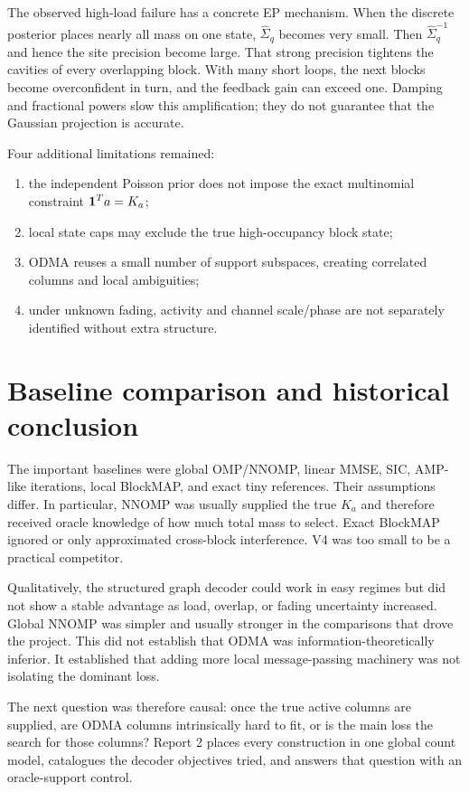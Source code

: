 \documentclass[11pt]{article}
\begin{document}
The observed high-load failure has a concrete EP mechanism. When the discrete posterior places nearly all mass on one
state, $\widehat\Sigma_q$ becomes very small. Then $\widehat\Sigma_q^{-1}$ and hence the site precision become large.
That strong precision tightens the cavities of every overlapping block. With many short loops, the next blocks become
overconfident in turn, and the feedback gain can exceed one. Damping and fractional powers slow this amplification;
they do not guarantee that the Gaussian projection is accurate.

Four additional limitations remained:
\begin{enumerate}
 \item the independent Poisson prior does not impose the exact multinomial constraint $\mathbf{1}^Ta=K_a$;
 \item local state caps may exclude the true high-occupancy block state;
 \item ODMA reuses a small number of support subspaces, creating correlated columns and local ambiguities;
 \item under unknown fading, activity and channel scale/phase are not separately identified without extra structure.
\end{enumerate}

\section{Baseline comparison and historical conclusion}

The important baselines were global OMP/NNOMP, linear MMSE, SIC, AMP-like iterations, local BlockMAP, and exact tiny
references. Their assumptions differ. In particular, NNOMP was usually supplied the true $K_a$ and therefore received
oracle knowledge of how much total mass to select. Exact BlockMAP ignored or only approximated cross-block
interference. V4 was too small to be a practical competitor.

Qualitatively, the structured graph decoder could work in easy regimes but did not show a stable advantage as load,
overlap, or fading uncertainty increased. Global NNOMP was simpler and usually stronger in the comparisons that drove
the project. This did not establish that ODMA was information-theoretically inferior. It established that adding more
local message-passing machinery was not isolating the dominant loss.

The next question was therefore causal: once the true active columns are supplied, are ODMA columns intrinsically hard
to fit, or is the main loss the search for those columns? Report 2 places every construction in one global count model,
catalogues the decoder objectives tried, and answers that question with an oracle-support control.
\end{document}
